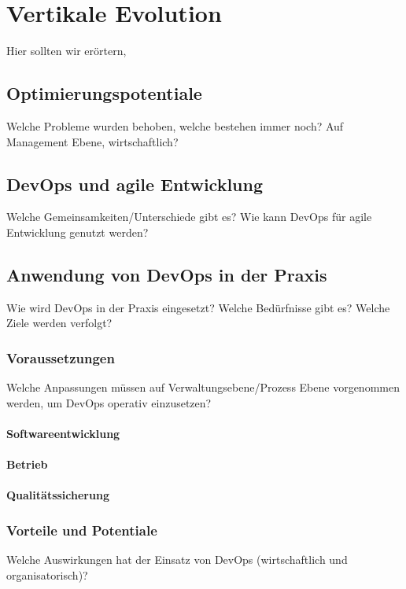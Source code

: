 \chapter{Vertikale Evolution} %

Hier sollten wir erörtern, 

\section{Optimierungspotentiale}
Welche Probleme wurden behoben, welche bestehen immer noch?
Auf Management Ebene, wirtschaftlich?

\section{DevOps und agile Entwicklung}
Welche Gemeinsamkeiten/Unterschiede gibt es? Wie kann DevOps für agile Entwicklung genutzt werden?

\section{Anwendung von DevOps in der Praxis}
Wie wird DevOps in der Praxis eingesetzt?
Welche Bedürfnisse gibt es? Welche Ziele werden verfolgt?

\subsection{Voraussetzungen}
Welche Anpassungen müssen auf Verwaltungsebene/Prozess Ebene vorgenommen werden, um DevOps operativ einzusetzen?

\subsubsection{Softwareentwicklung}

\subsubsection{Betrieb}

\subsubsection{Qualitätssicherung}

\subsection{Vorteile und Potentiale}
Welche Auswirkungen hat der Einsatz von DevOps (wirtschaftlich und organisatorisch)?

